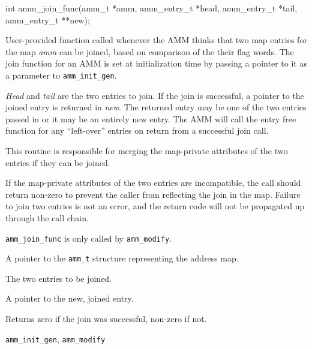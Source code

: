 \begin{apisyn}

	\funcproto int amm_join_func(amm_t *amm,
			amm_entry_t *head, amm_entry_t *tail,
			\outparam amm_entry_t **new);
\end{apisyn}
\begin{apidesc}
	User-provided function called whenever the AMM thinks that
	two map entries for the map \emph{amm}
	can be joined, based on comparison of the their flag words.
	The join function for an AMM is set at initialization time
	by passing a pointer to it as a parameter to {\tt amm_init_gen}.

	\emph{Head} and \emph{tail} are the two entries to join.
	If the join is successful, a pointer to the joined entry
	is returned in \emph{new}.
	The returned entry may be one of the two entries passed in
	or it may be an entirely new entry.
	The AMM will call the entry free function for any ``left-over''
	entries on return from a successful join call.

	This routine is responsible for merging the map-private attributes
	of the two entries if they can be joined.

	If the map-private attributes of the two entries are incompatible,
	the call should return non-zero to prevent the caller from reflecting
	the join in the map.
	Failure to join two entries is not an error,
	and the return code will not be propagated up through the call chain.

	{\tt amm_join_func} is only called by {\tt amm_modify}.
\end{apidesc}
\begin{apiparm}
	\item[amm]
		A pointer to the {\tt amm_t} structure
		representing the address map.
	\item[head,tail]
		The two entries to be joined.
	\item[new]
		A pointer to the new, joined entry.
\end{apiparm}
\begin{apiret}
	Returns zero if the join was successful, non-zero if not.
\end{apiret}
\begin{apirel}
	{\tt amm_init_gen}, {\tt amm_modify}
\end{apirel}


